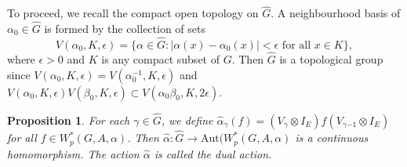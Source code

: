 \documentclass[reqno,11pt]{amsart}
\theoremstyle{plain}
\newtheorem{prop}[thm]{Proposition}
\theoremstyle{definition}
\theoremstyle{remark}
\begin{document}
To proceed, we recall the compact open topology on $\hat{G}$. A neighbourhood basis of $\alpha_0 \in \hat{G}$ is formed by the collection of sets
$$V(\alpha_0, K, \epsilon) = \{ \alpha \in \hat{G} : |\alpha(x) - \alpha_0(x)| < \epsilon \text{ for all } x \in K \},$$
where $\epsilon>0$ and $K$ is any compact subset of $G$. Then $\hat{G}$ is a topological group since $V(\alpha_0,K,\epsilon) = V(\alpha_0^{-1}, K, \epsilon)$ and
$V(\alpha_0, K, \epsilon)V(\beta_0, K, \epsilon) \subset V(\alpha_0\beta_0, K, 2\epsilon)$.

\begin{prop}
For each $\gamma\in\hat{G}$, we define $\hat{\alpha}_\gamma(f)=(V_\gamma\otimes I_E)f(V_{\gamma{-1}}\otimes I_E)$ for all $f\in W^*_p(G,A,\alpha)$. Then  $\hat{\alpha}:\hat{G}\rightarrow \mathrm{Aut}(W^*_p(G,A,\alpha)$ is a continuous homomorphism.  The action $\hat{\alpha}$ is called the dual action.
\end{prop}
\end{document}
